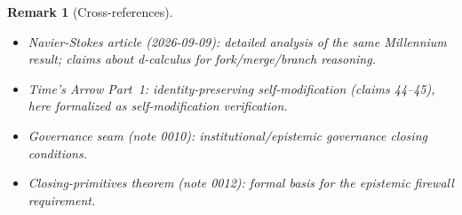 \documentclass[11pt,a4paper]{article}
\newtheorem{remark}[definition]{Remark}
\begin{document}
\begin{remark}[Cross-references]
\begin{itemize}
\item Navier-Stokes article (2026-09-09): detailed analysis of the
  same Millennium result; claims about d-calculus for fork/merge/branch
  reasoning.
\item Time's Arrow Part~1: identity-preserving self-modification
  (claims 44--45), here formalized as self-modification verification.
\item Governance seam (note 0010): institutional/epistemic governance
  closing conditions.
\item Closing-primitives theorem (note 0012): formal basis for the
  epistemic firewall requirement.
\end{itemize}
\end{remark}
\end{document}
